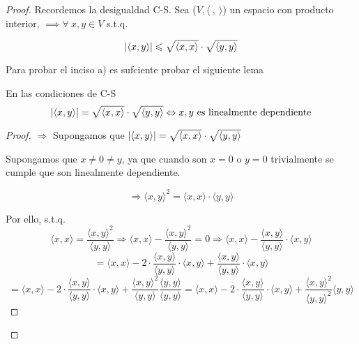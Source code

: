 \documentclass[12pt]{article}
\begin{document}
\begin{enumerate}[label=\textbf{\arabic*}.]
\begin{proof}
    Recordemos la desigualdad C-S. Sea ($V, \langle \: , \: \rangle$) un espacio con producto interior, $ \implies  \forall \: x,y \in V$ s.t.q.

    \begin{equation*}
        \abs{\langle x,y \rangle} \leqslant \sqrt{\langle x,x \rangle} \cdot \sqrt{\langle y,y \rangle}
    \end{equation*}

    Para probar el inciso a) es sufciente probar el siguiente lema

    \begin{lema}
        En las condiciones de C-S
        \begin{equation*}
            \abs{\langle x,y \rangle} = \sqrt{\langle x,x \rangle} \cdot \sqrt{\langle y,y \rangle} \Leftrightarrow x,y \text{ es linealmente dependiente}
        \end{equation*}
    \end{lema}
    \begin{proof}
        $\Rightarrow$ Supongamos que $ \abs{\langle x,y \rangle} = \sqrt{\langle x,x \rangle} \cdot \sqrt{\langle y,y \rangle}$

        Supongamos que $x \neq 0 \neq y$, ya que cuando son $x=0$ o $y=0$ trivialmente se cumple que son linealmente dependiente.

        \begin{equation*}
            \Rightarrow {\langle x,y \rangle}^{2} = \langle x,x \rangle \cdot \langle y,y \rangle
        \end{equation*}

        Por ello, s.t.q.
        \begin{equation*}
            \langle x,x \rangle = \frac{{\langle x,y \rangle}^{2}}{\langle y,y \rangle} \Rightarrow \langle x,x \rangle - \frac{{\langle x,y \rangle}^{2}}{\langle y,y \rangle} = 0 \Rightarrow \langle x,x \rangle - \frac{\langle x,y \rangle }{\langle y,y \rangle } \cdot \langle x,y \rangle 
        \end{equation*}
        \begin{equation*}
            =  \langle x,x \rangle - 2 \cdot \frac{\langle x,y \rangle }{\langle y,y \rangle } \cdot \langle x,y \rangle + \frac{\langle x,y \rangle }{\langle y,y \rangle } \cdot \langle x,y \rangle 
        \end{equation*}
        \begin{equation*}
            = \langle x,x \rangle - 2 \cdot \frac{\langle x,y \rangle }{\langle y,y \rangle } \cdot \langle x,y \rangle + \frac{{\langle x,y \rangle}^{2} }{\langle y,y \rangle } \frac{\langle y,y \rangle}{\langle y,y \rangle} = \langle x,x \rangle - 2 \cdot \frac{\langle x,y \rangle }{\langle y,y \rangle } \cdot \langle x,y \rangle + \frac{{\langle x,y \rangle}^{2} }{{\langle y,y \rangle}^{2}} \langle y,y \rangle
        \end{equation*}


\end{proof}
\end{proof}
\end{enumerate}
\end{document}
